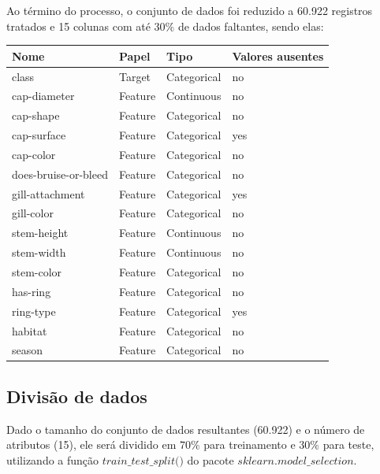\documentclass[12pt,a4paper]{article}
\begin{document}
\vspace{0.15cm}
\quad\space Ao término do processo, o conjunto de dados foi reduzido a 60.922 registros tratados e 15 colunas com até 30$\%$ de dados faltantes, sendo elas:

\begin{table}[h]
	\centering
	\begin{tabular}{|l|l|l|l|}
		\hline
		\textbf{Nome} & \textbf{Papel} & \textbf{Tipo} & \textbf{ Valores ausentes} \\
		\hline
		class & Target & Categorical & no \\
		\hline
		cap-diameter & Feature & Continuous & no \\
		\hline
		cap-shape & Feature & Categorical & no \\
		\hline
		cap-surface & Feature & Categorical & yes \\
		\hline
		cap-color & Feature & Categorical & no \\
		\hline
		does-bruise-or-bleed & Feature & Categorical & no \\
		\hline
		gill-attachment & Feature & Categorical & yes \\
		\hline
		gill-color & Feature & Categorical & no \\
		\hline
		stem-height & Feature & Continuous & no \\
		\hline
		stem-width & Feature & Continuous & no \\
		\hline
		stem-color & Feature & Categorical & no \\
		\hline
		has-ring & Feature & Categorical & no \\
		\hline
		ring-type & Feature & Categorical & yes \\
		\hline
		habitat & Feature & Categorical & no \\
		\hline
		season & Feature & Categorical & no \\
		\hline
	\end{tabular}
\end{table}

\subsection{Divisão de dados}

\quad\space Dado o tamanho do conjunto de dados resultantes (60.922) e o número de atributos (15), ele será dividido em $70\%$ para treinamento e $30\%$ para teste, utilizando a função $\textit{train$$\_$$test$$\_$$split()}$ do pacote $\textit{sklearn.model$$\_$$selection}$.
\end{document}
